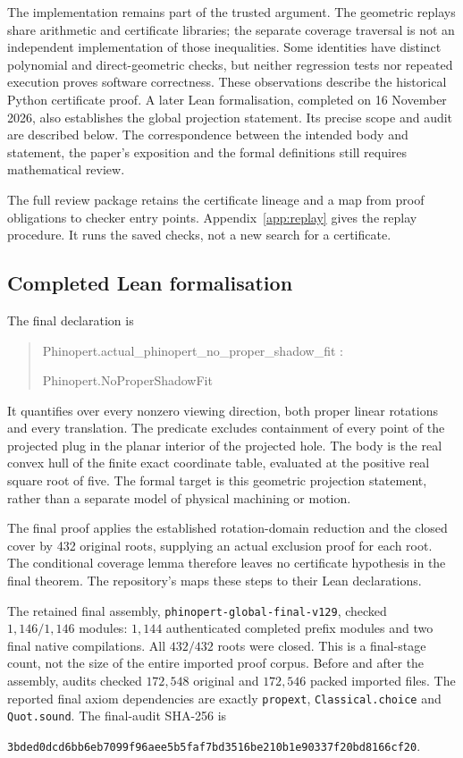 \documentclass[11pt,a4paper]{article}
\begin{document}
The implementation remains part of the trusted argument. The geometric
replays share arithmetic and certificate libraries; the separate coverage
traversal is not an independent implementation of those inequalities.
Some identities have distinct polynomial and direct-geometric checks, but
neither regression tests nor repeated execution proves software correctness.
These observations describe the historical Python certificate proof. A later
Lean formalisation, completed on 16 November 2026, also establishes the global
projection statement. Its precise scope and audit are described below. The
correspondence between the intended body and statement, the paper's exposition
and the formal definitions still requires mathematical review.

The full review package retains the certificate lineage and a map from proof
obligations to checker entry points. Appendix~\ref{app:replay} gives the replay
procedure. It runs the saved checks, not a new search for a certificate.

\subsection{Completed Lean formalisation}
The final declaration is
\begin{quote}\small\ttfamily
Phinopert.actual\_phinopert\_no\_proper\_shadow\_fit :\par
\quad Phinopert.NoProperShadowFit
\end{quote}
It quantifies over every nonzero viewing direction, both proper linear
rotations and every translation. The predicate excludes containment of every
point of the projected plug in the planar interior of the projected hole.
The body is the real convex hull of the finite exact coordinate table,
evaluated at the positive real square root of five. The formal target is
this geometric projection statement, rather than a separate model of
physical machining or motion.

The final proof applies the established rotation-domain reduction and the
closed cover by 432 original roots, supplying an actual exclusion proof for
each root. The conditional coverage lemma therefore leaves no certificate
hypothesis in the final theorem. The repository's
 maps these steps to their Lean declarations.

The retained final assembly, \texttt{phinopert-global-final-v129}, checked
$1{,}146/1{,}146$ modules: $1{,}144$ authenticated completed prefix modules
and two final native compilations. All $432/432$ roots were closed. This is
a final-stage count, not the size of the entire imported proof corpus.
Before and after the assembly, audits checked $172{,}548$ original and
$172{,}546$ packed imported files. The reported final axiom dependencies are
exactly \texttt{propext}, \texttt{Classical.choice} and \texttt{Quot.sound}.
The final-audit SHA-256 is
\begin{center}\small
\nolinkurl{3bded0dcd6bb6eb7099f96aee5b5faf7bd3516be210b1e90337f20bd8166cf20}.
\end{center}
\end{document}

